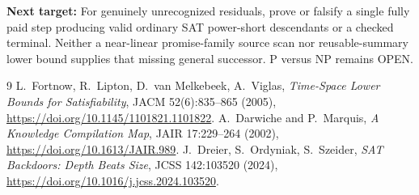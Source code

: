 \documentclass[11pt]{article}
\begin{document}
\noindent\textbf{Next target:} For genuinely unrecognized residuals, prove or falsify a single fully paid step producing valid ordinary SAT power-short descendants or a checked terminal. Neither a near-linear promise-family source scan nor reusable-summary lower bound supplies that missing general successor. P versus NP remains OPEN.

\begin{thebibliography}{9}
 L.~Fortnow, R.~Lipton, D.~van Melkebeek, A.~Viglas, \emph{Time-Space Lower Bounds for Satisfiability}, JACM 52(6):835--865 (2005), \url{https://doi.org/10.1145/1101821.1101822}.
 A.~Darwiche and P.~Marquis, \emph{A Knowledge Compilation Map}, JAIR 17:229--264 (2002), \url{https://doi.org/10.1613/JAIR.989}.
 J.~Dreier, S.~Ordyniak, S.~Szeider, \emph{SAT Backdoors: Depth Beats Size}, JCSS 142:103520 (2024), \url{https://doi.org/10.1016/j.jcss.2024.103520}.
\end{thebibliography}
\end{document}
